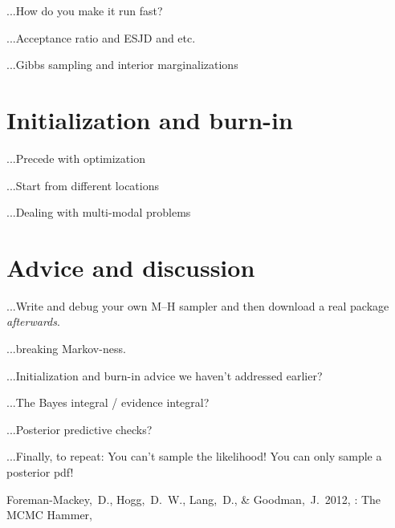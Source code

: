 \documentclass[12pt,twoside,pdftex]{article}
\begin{document}
...How do you make it run fast?

...Acceptance ratio and ESJD and etc.


...Gibbs sampling and interior marginalizations

\section{Initialization and burn-in}

...Precede with optimization

...Start from different locations

...Dealing with multi-modal problems

\section{Advice and discussion}

...Write and debug your own M--H sampler and then download a real
package \emph{afterwards}.

...breaking Markov-ness.

...Initialization and burn-in advice we haven't addressed earlier?

...The Bayes integral / evidence integral?

...Posterior predictive checks?

...Finally, to repeat: You can't sample the likelihood!  You can only
sample a posterior pdf!


\clearpage
{}\theendnotes

\clearpage
\begin{thebibliography}{}
  Foreman-Mackey,~D., Hogg,~D.~W., Lang,~D., \& Goodman,~J.\ 2012,
  : The MCMC Hammer,
\end{thebibliography}
\end{document}
